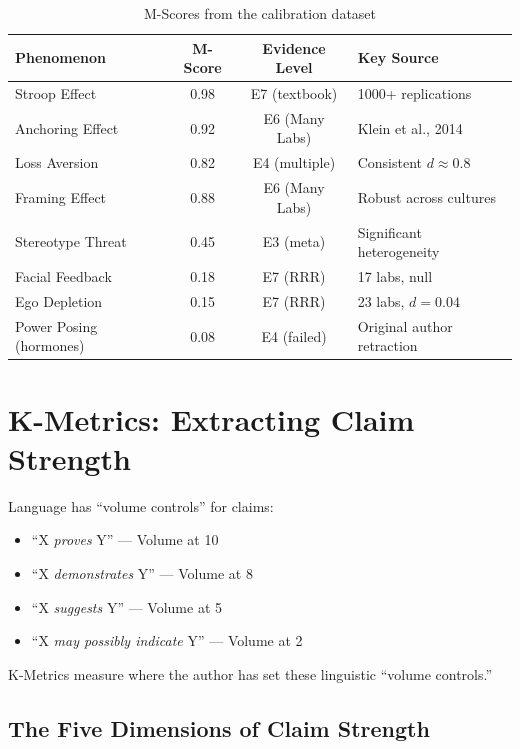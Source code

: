\documentclass[11pt,a4paper]{article}
\begin{document}
\begin{table}[H]
\centering
\caption{M-Scores from the calibration dataset}
\begin{tabular}{lccl}
\toprule
\textbf{Phenomenon} & \textbf{M-Score} & \textbf{Evidence Level} & \textbf{Key Source} \\
\midrule
Stroop Effect & 0.98 & E7 (textbook) & 1000+ replications \\
Anchoring Effect & 0.92 & E6 (Many Labs) & Klein et al., 2014 \\
Loss Aversion & 0.82 & E4 (multiple) & Consistent $d \approx 0.8$ \\
Framing Effect & 0.88 & E6 (Many Labs) & Robust across cultures \\
Stereotype Threat & 0.45 & E3 (meta) & Significant heterogeneity \\
Facial Feedback & 0.18 & E7 (RRR) & 17 labs, null \\
Ego Depletion & 0.15 & E7 (RRR) & 23 labs, $d = 0.04$ \\
Power Posing (hormones) & 0.08 & E4 (failed) & Original author retraction \\
\bottomrule
\end{tabular}
\end{table}



\section{K-Metrics: Extracting Claim Strength}

\begin{analogybox}
Language has ``volume controls'' for claims:
\begin{itemize}
    \item ``X \emph{proves} Y'' --- Volume at 10
    \item ``X \emph{demonstrates} Y'' --- Volume at 8
    \item ``X \emph{suggests} Y'' --- Volume at 5
    \item ``X \emph{may possibly indicate} Y'' --- Volume at 2
\end{itemize}
K-Metrics measure where the author has set these linguistic ``volume controls.''
\end{analogybox}


\subsection{The Five Dimensions of Claim Strength}
\end{document}
